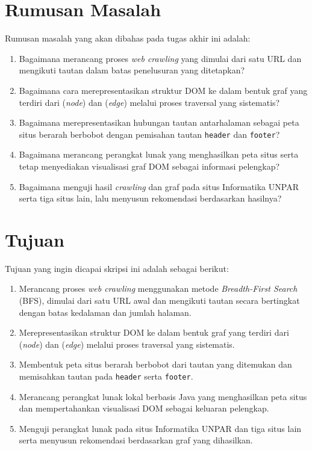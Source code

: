 \section{Rumusan Masalah}
\label{sec:1:rumusan}

Rumusan masalah yang akan dibahas pada tugas akhir ini adalah:
\begin{enumerate}
    \item Bagaimana merancang proses \textit{web crawling} yang dimulai dari satu URL dan mengikuti tautan dalam batas penelusuran yang ditetapkan?
        
    \item Bagaimana cara merepresentasikan struktur DOM ke dalam bentuk graf yang terdiri dari (\textit{node}) dan (\textit{edge}) melalui proses traversal yang sistematis?
        
    \item Bagaimana merepresentasikan hubungan tautan antarhalaman sebagai peta situs berarah berbobot dengan pemisahan tautan \texttt{header} dan \texttt{footer}?

    \item Bagaimana merancang perangkat lunak yang menghasilkan peta situs serta tetap menyediakan visualisasi graf DOM sebagai informasi pelengkap?

    \item Bagaimana menguji hasil \textit{crawling} dan graf pada situs Informatika UNPAR serta tiga situs lain, lalu menyusun rekomendasi berdasarkan hasilnya?
\end{enumerate}

\section{Tujuan}
\label{sec:1:tujuan}

Tujuan yang ingin dicapai skripsi ini adalah sebagai berikut:
\begin{enumerate}
    \item Merancang proses \textit{web crawling} menggunakan metode \textit{Breadth-First Search} (BFS), dimulai dari satu URL awal dan mengikuti tautan secara bertingkat dengan batas kedalaman dan jumlah halaman.
    
    \item Merepresentasikan struktur DOM ke dalam bentuk graf yang terdiri dari (\textit{node}) dan (\textit{edge}) melalui proses traversal yang sistematis.
    
    \item Membentuk peta situs berarah berbobot dari tautan yang ditemukan dan memisahkan tautan pada \texttt{header} serta \texttt{footer}.

    \item Merancang perangkat lunak lokal berbasis Java yang menghasilkan peta situs dan mempertahankan visualisasi DOM sebagai keluaran pelengkap.

    \item Menguji perangkat lunak pada situs Informatika UNPAR dan tiga situs lain serta menyusun rekomendasi berdasarkan graf yang dihasilkan.
\end{enumerate}

